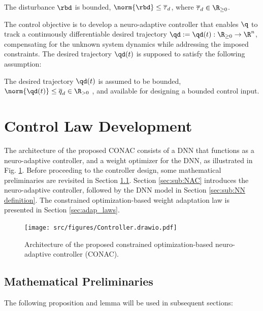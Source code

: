 \documentclass[journal]{IEEEtran}
\begin{document}
\begin{prop}
    The disturbance $\rbd$ is bounded, \ie $\norm{\rbd}\le \overline\tau_d$, where $\overline\tau_d\in\R_{\ge0}$.
    \label{prop:dis_bound}
\end{prop}

The control objective is to develop a neuro-adaptive controller that enables $\q$ to track a continuously differentiable desired trajectory $\qd:=\qd(t): \R_{\ge0} \to \R^n$, compensating for the unknown system dynamics while addressing the imposed constraints.
The desired trajectory $\qd(t)$ is supposed to satisfy the following assumption:
\begin{assum}
    The desired trajectory $\qd(t)$ is assumed to be bounded, \ie $\norm{\qd(t)}\le \overline{q}_d\in\R_{>0}$ , and available for designing a bounded control input.
    \label{assum:feasible}
\end{assum}

\section{Control Law Development}\label{sec:ctrl design}

The architecture of the proposed CONAC consists of a DNN that functions as a neuro-adaptive controller, and a weight optimizer for the DNN, as illustrated in Fig. \ref{fig:ctrl:diagram}.
Before proceeding to the controller design, some mathematical preliminaries are revisited in Section \ref{sec:sub:math preliminaries}. 
Section \ref{sec:sub:NAC} introduces the neuro-adaptive controller, followed by the DNN model in Section \ref{sec:sub:NN definition}. 
The constrained optimization-based weight adaptation law is presented in Section \ref{sec:adap_laws}.

\begin{figure}[!t]
    \centering
    \texttt{[image: src/figures/Controller.drawio.pdf]}
    \caption{Architecture of the proposed constrained optimization-based neuro-adaptive controller (CONAC).}
    \label{fig:ctrl:diagram}
\end{figure}

\subsection{Mathematical Preliminaries}\label{sec:sub:math preliminaries}

The following proposition and lemma will be used in subsequent sections:
\end{document}
